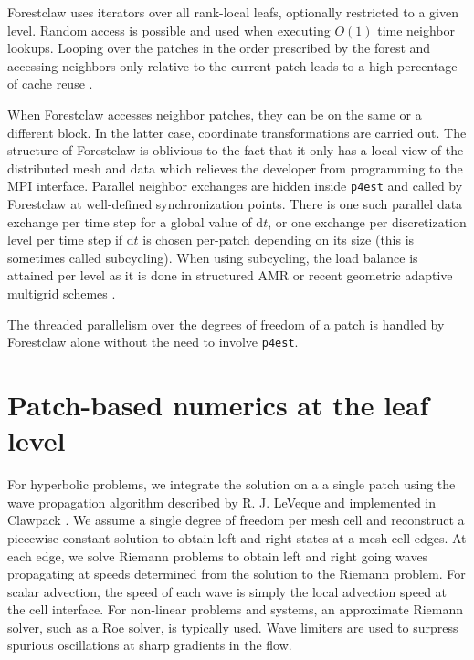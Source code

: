 \documentclass{IOS-Book-Article}     %
\newcommand{\comment}[1]{\textcolor{green}{[DAC: #1]}\xspace}
\newcommand{\todo}[1]{\textcolor{red}{[TODO: #1]}\xspace}
\newcommand{\dt}{\mathrm{d}t}
\newcommand{\forestclaw}{Forestclaw\xspace}
\newcommand{\pforest}{\texttt{p4est}\xspace}
\begin{document}
\forestclaw uses iterators over all rank-local leafs, optionally restricted to
a given level.  Random access is possible and used when executing $O(1)$ time
neighbor lookups.  Looping over the patches in the order prescribed by the
forest
and
accessing neighbors only relative to the current patch leads to a high
percentage of cache reuse
\cite{BursteddeBurtscherGhattasEtAl09}.

When \forestclaw accesses neighbor patches, they can be on the same or a
different block.  In the latter case, coordinate transformations are carried
out.  The structure of \forestclaw is oblivious to the fact that it only has a
local view of the distributed mesh and data which relieves the developer from
programming to the MPI interface.  Parallel neighbor exchanges are hidden
inside \pforest and called by \forestclaw at well-defined synchronization
points.  There is one such parallel data exchange per time step for a global
value of $\dt$, or one exchange per discretization level per time step if $\dt$
is chosen per-patch depending on its size (this is sometimes called
subcycling).  When using subcycling, the load balance is attained per level as
it is done in structured AMR or recent geometric adaptive multigrid schemes
\cite{SundarBirosBursteddeEtAl12}.

The threaded parallelism over the degrees of freedom of a patch is handled by
\forestclaw alone without the need to involve \pforest.






\section{Patch-based numerics at the leaf level}

For hyperbolic problems, we integrate the solution on a a single patch
using the wave propagation algorithm described by R. J. LeVeque and
implemented in {\sc Clawpack} \cite{le:2002, clawpack}.  We assume a
single degree of freedom per mesh cell and reconstruct a piecewise
constant solution to obtain left and right states at a mesh cell
edges.  At each edge, we solve Riemann problems to obtain left and
right going waves propagating at speeds determined from the solution
to the Riemann problem.  For scalar advection, the speed of each wave
is simply the local advection speed at the cell interface. For
non-linear problems and systems, an approximate Riemann solver, such
as a Roe solver, is typically used. Wave limiters are used to surpress
spurious oscillations at sharp gradients in the flow.
\end{document}
